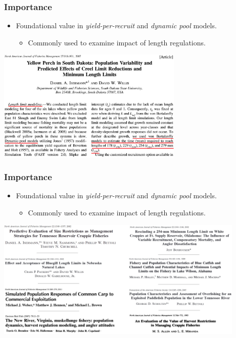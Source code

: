 \documentclass[xcolor=dvipsnames]{beamer}\usepackage[]{graphicx}\usepackage[]{color}
\begin{document}
\begin{frame}[fragile, t]
\frametitle{Importance}
\begin{itemize}
  \item Foundational value in \textit{yield-per-recruit} and \textit{dynamic pool} models.
  \begin{itemize}
    \item Commonly used to examine impact of length regulations.
  \end{itemize}
\end{itemize}
\pause
\begin{center}
\includegraphics[width=3.5in]{Figs/Isermann-etal-2007.jpg}
\end{center}
\end{frame}


\begin{frame}[fragile, t]
\frametitle{Importance}
\begin{itemize}
  \item Foundational value in \textit{yield-per-recruit} and \textit{dynamic pool} models.
  \begin{itemize}
    \item Commonly used to examine impact of length regulations.
  \end{itemize}
\end{itemize}

\smallskip

\begin{center}
\includegraphics[width=4.7in]{Figs/tr-examples.jpg}
\end{center}
\end{frame}
\end{document}

